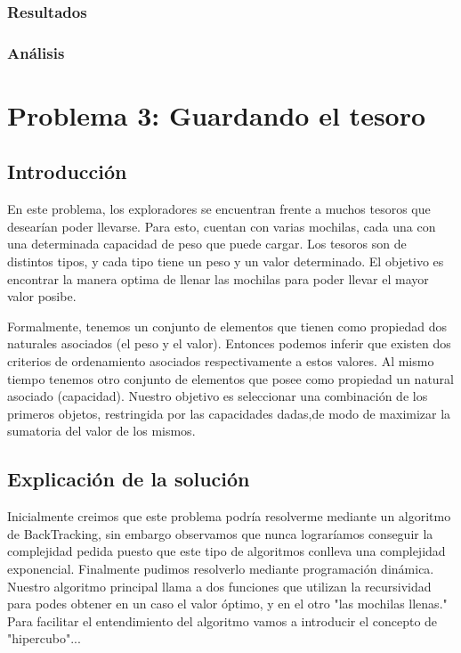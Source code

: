 \documentclass[spanish,12pt]{article}
\begin{document}
\subsubsection{Resultados}

\subsubsection{Análisis}





\section{Problema 3: Guardando el tesoro}

\subsection{Introducción}

En este problema, los exploradores se encuentran frente a muchos tesoros que desearían poder llevarse. Para esto, cuentan con varias mochilas, cada una con una determinada capacidad de peso que puede cargar.
Los tesoros son de distintos tipos, y cada tipo tiene un peso y un valor determinado.
El objetivo es encontrar la manera optima de llenar las mochilas para poder llevar el mayor valor posibe.

Formalmente, tenemos un conjunto de elementos que tienen como propiedad dos naturales asociados (el peso y el valor). Entonces podemos inferir que existen dos criterios de ordenamiento asociados respectivamente a estos valores.
Al mismo tiempo tenemos otro conjunto de elementos que posee como propiedad un natural asociado (capacidad).
Nuestro objetivo es seleccionar una combinación de los primeros objetos, restringida por las capacidades dadas,de modo de maximizar la sumatoria del valor de los mismos.


\subsection{Explicación de la solución}

   Inicialmente creimos que este problema podría resolverme mediante un algoritmo de BackTracking, sin embargo observamos que nunca lograríamos conseguir la complejidad pedida puesto que este tipo de algoritmos conlleva una complejidad exponencial.
   Finalmente pudimos resolverlo mediante programación dinámica. Nuestro algoritmo principal llama a dos funciones que utilizan la recursividad para podes obtener en un caso el valor óptimo, y en el otro "las mochilas llenas."
   Para facilitar el entendimiento del algoritmo vamos a introducir el concepto de "hipercubo"...%
\end{document}
